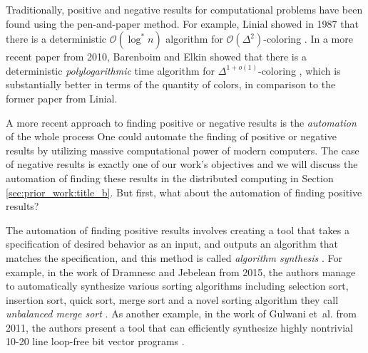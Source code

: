 Traditionally, positive and negative results for computational problems have been found using the pen-and-paper method.
For example, Linial showed in 1987 that there is a deterministic \(\mathcal{O}(\log^* n)\) algorithm for \(\mathcal{O}(\Delta^2)\)-coloring \cite{DBLP:conf/focs/Linial87}.
In a more recent paper from 2010, Barenboim and Elkin showed that there is a deterministic \emph{polylogarithmic} time algorithm for \(\Delta^{1 + o(1)}\)-coloring \cite{DBLP:conf/podc/BarenboimE10}, which is substantially better in terms of the quantity of colors, in comparison to the former paper \cite{DBLP:conf/focs/Linial87} from Linial.

A more recent approach to finding positive or negative results is the \emph{automation} of the whole process
One could automate the finding of positive or negative results by utilizing massive computational power of modern computers.
The case of negative results is exactly one of our work's objectives and we will discuss the automation of finding these results in the distributed computing in Section \ref{sec:prior_work:title_b}.
But first, what about the automation of finding positive results?

The automation of finding positive results involves creating a tool that takes a specification of desired behavior as an input, and outputs an algorithm that matches the specification, and this method is called \emph{algorithm synthesis} \cite{DBLP:phd/basesearch/Rybicki16}.
For example, in the work of Dramnesc and Jebelean from 2015, the authors manage to automatically synthesize various sorting algorithms including selection sort, insertion sort, quick sort, merge sort and a novel sorting algorithm they call \emph{unbalanced merge sort} \cite{DBLP:journals/jsc/DramnescJ15}.
As another example, in the work of Gulwani et~al. from 2011, the authors present a tool that can efficiently synthesize highly nontrivial 10-20 line loop-free bit vector programs \cite{DBLP:conf/pldi/GulwaniJTV11}.

